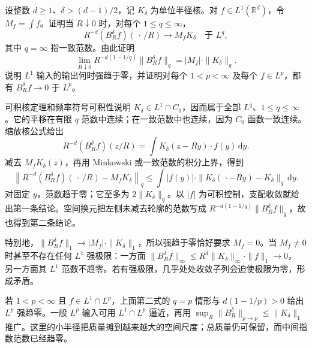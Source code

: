 \begin{exercise}\label{b2:ex:24-new-2}
设整数 \(d\geq1\)、\(\delta>(d-1)/2\)，记 \(K_\delta\) 为单位半径核。对 \(f\in L^1(\mathbb R^d)\)，令 \(M_f=\int f\)。证明当 \(R\downarrow0\) 时，对每个 \(1\leq q\leq\infty\)，
\[
 R^{-d}(B_R^\delta f)(\,\cdot\,/R)
       \longrightarrow M_fK_\delta\quad\text{于 }L^q,
\]
其中 \(q=\infty\) 指一致范数。由此证明
\[
 \lim_{R\downarrow0}R^{-d(1-1/q)}\|B_R^\delta f\|_q
       =|M_f|\cdot\|K_\delta\|_q.
\]
说明 \(L^1\) 输入的输出何时强趋于零，并证明对每个 \(1<p<\infty\) 及每个 \(f\in L^p\)，都有 \(B_R^\delta f\to0\) 于 \(L^p\)。
\end{exercise}
\begin{solution}
可积核定理和频率符号可积性说明 \(K_\delta\in L^1\cap C_0\)，因而属于全部 \(L^q\)、\(1\leq q\leq\infty\)。它的平移在有限 \(q\) 范数中连续；在一致范数中也连续，因为 \(C_0\) 函数一致连续。缩放核公式给出
\[
 R^{-d}(B_R^\delta f)(z/R)=\int K_\delta(z-Ry)\cdot f(y)\,\mathrm dy.
\]
减去 \(M_fK_\delta(z)\)，再用 Minkowski 或一致范数的积分上界，得到
\[
 \left\|R^{-d}(B_R^\delta f)(\,\cdot\,/R)-M_fK_\delta\right\|_q
 \leq\int|f(y)|\cdot
          \|K_\delta(\,\cdot-Ry)-K_\delta\|_q\,\mathrm dy.
\]
对固定 \(y\)，范数趋于零；它至多为 \(2\|K_\delta\|_q\)。以 \(|f|\) 为可积控制，支配收敛就给出第一条结论。空间换元把左侧未减去轮廓的范数写成
\(R^{-d(1-1/q)}\|B_R^\delta f\|_q\)，故也得到第二条结论。

特别地，\(\|B_R^\delta f\|_1\to|M_f|\cdot\|K_\delta\|_1\)，所以强趋于零恰好要求 \(M_f=0\)。当 \(M_f\ne0\) 时甚至不存在任何 \(L^1\) 强极限：一方面
\(\|B_R^\delta f\|_\infty\leq R^d\|K_\delta\|_\infty\cdot\|f\|_1\to0\)，
另一方面其 \(L^1\) 范数不趋零。若有强极限，几乎处处收敛子列会迫使极限为零，形成矛盾。

若 \(1<p<\infty\) 且 \(f\in L^1\cap L^p\)，上面第二式的 \(q=p\) 情形与 \(d(1-1/p)>0\) 给出 \(L^p\) 强趋零。一般 \(L^p\) 输入可用 \(L^1\cap L^p\) 逼近，再用 \(\sup_R\|B_R^\delta\|_{p\to p}\leq\|K_\delta\|_1\) 推广。这里的小半径把质量摊到越来越大的空间尺度；总质量仍可保留，而中间指数范数已经趋零。
\end{solution}


